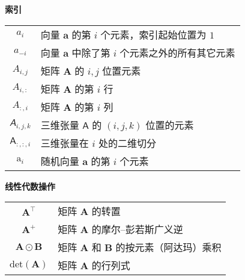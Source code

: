 \vspace{1em}

\begin{center}
  {\Large\bfseries 索引}\\
  \vspace{1em}
  \begin{tabular}{c l}
    $a_i$ & 向量 $\pmb{a}$ 的第 $i$ 个元素，索引起始位置为 $1$ \\
    $a_{-i}$ & 向量 $\pmb{a}$ 中除了第 $i$ 个元素之外的所有其它元素 \\
    $A_{i,j}$ & 矩阵 $\pmb{A}$ 的 $i,j$ 位置元素 \\
    $A_{i,:}$ & 矩阵 $\pmb{A}$ 的第 $i$ 行 \\
    $A_{:,i}$ & 矩阵 $\pmb{A}$ 的第 $i$ 列 \\
    $\mathsfit{A}_{i,j,k}$ & 三维张量 $\pmb{\mathsf{A}}$ 的 $(i,j,k)$ 位置的元素 \\
    $\pmb{\mathsf{A}}_{:,:,i}$ & 三维张量在 $i$ 处的二维切分 \\
    $\mathrm{a}_i$ & 随机向量 $\mathbf{a}$ 的第 $i$ 个元素
  \end{tabular}
\end{center}

\vspace{1em}

\begin{center}
  {\Large\bfseries 线性代数操作}\\
  \vspace{1em}
  \begin{tabular}{c l}
    $\pmb{A}^{\top}$ & 矩阵 $\pmb{A}$ 的转置 \\
    $\pmb{A}^+$ & 矩阵 $\pmb{A}$ 的摩尔--彭若斯广义逆 \\
    $\pmb{A} \odot \pmb{B}$ & 矩阵 $\pmb{A}$ 和 $\pmb{B}$ 的按元素（阿达玛）乘积 \\
    $\mathrm{det}(\pmb{A})$ & 矩阵 $\pmb{A}$ 的行列式
  \end{tabular}
\end{center}

\vspace{1em}


